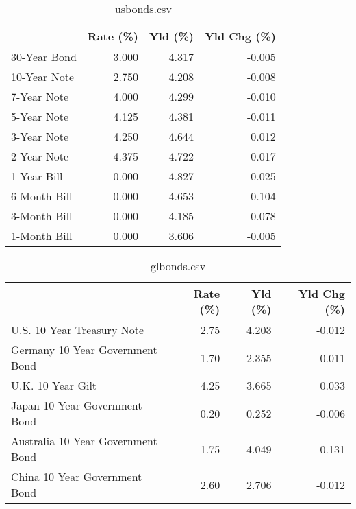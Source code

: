 \documentclass{article}%
\begin{document}
%


\begin{table}[htbp]%
\caption{usbonds.csv}%
\centering%
\begin{adjustbox}{width=1\textwidth}%
\begin{tabular}{lrrr}
\toprule
             &  Rate (\%) &  Yld (\%) &  Yld Chg (\%) \\
\midrule
30-Year Bond &     3.000 &    4.317 &       -0.005 \\
10-Year Note &     2.750 &    4.208 &       -0.008 \\
 7-Year Note &     4.000 &    4.299 &       -0.010 \\
 5-Year Note &     4.125 &    4.381 &       -0.011 \\
 3-Year Note &     4.250 &    4.644 &        0.012 \\
 2-Year Note &     4.375 &    4.722 &        0.017 \\
 1-Year Bill &     0.000 &    4.827 &        0.025 \\
6-Month Bill &     0.000 &    4.653 &        0.104 \\
3-Month Bill &     0.000 &    4.185 &        0.078 \\
1-Month Bill &     0.000 &    3.606 &       -0.005 \\
\bottomrule
\end{tabular}
%
\end{adjustbox}%
\end{table}

%


\begin{table}[htbp]%
\caption{glbonds.csv}%
\centering%
\begin{adjustbox}{width=1\textwidth}%
\begin{tabular}{lrrr}
\toprule
                                  &  Rate (\%) &  Yld (\%) &  Yld Chg (\%) \\
\midrule
       U.S. 10 Year Treasury Note &      2.75 &    4.203 &       -0.012 \\
  Germany 10 Year Government Bond &      1.70 &    2.355 &        0.011 \\
                U.K. 10 Year Gilt &      4.25 &    3.665 &        0.033 \\
    Japan 10 Year Government Bond &      0.20 &    0.252 &       -0.006 \\
Australia 10 Year Government Bond &      1.75 &    4.049 &        0.131 \\
    China 10 Year Government Bond &      2.60 &    2.706 &       -0.012 \\
\bottomrule
\end{tabular}
%
\end{adjustbox}%
\end{table}
\end{document}
